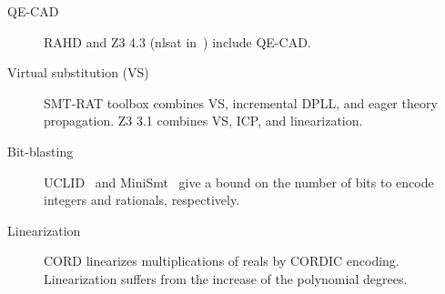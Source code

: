 \documentclass[runningheads,a4paper,oribibl]{llncs}
\newcommand{\mizuhito}[1]{\{{\bf Mizuhito:~\sf #1}\}} %
\begin{document}
\begin{description}
\item[QE-CAD] RAHD \cite{Passmore09combineddecision} and 
Z3 4.3 (nlsat in~\cite{Jovanovic13}) include QE-CAD. 

\item[Virtual substitution (VS)]
SMT-RAT toolbox \cite{smtrat} combines 
VS, incremental DPLL, and %
eager theory propagation. 
Z3 3.1 %
combines VS, ICP, and linearization.

\item[Bit-blasting] %
UCLID~\cite{Bryant07decidingbit-vector} and MiniSmt~\cite{Zankl:2010:SNR:1939141.1939168} give a bound on the number of bits 
to encode integers and rationals, respectively. %

\item[Linearization] %
CORD \cite{cordic} %
linearizes multiplications of reals by CORDIC encoding. 
Linearization suffers from the increase of the polynomial degrees. 
\end{description}
\end{document}
